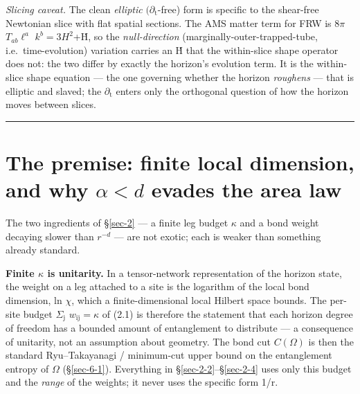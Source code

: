 \documentclass[12pt]{iopart}
\begin{document}
\emph{Slicing caveat.} The clean \emph{elliptic}
\((\partial _{\mathrm{t}}\)-free) form is specific to the shear-free
Newtonian slice with flat spatial sections. The AMS matter term for FRW
is \(8\pi\) \(T_{ab}\ell ^{a}\) \(k^{b} = 3H^{2}\)+Ḣ, so the
\emph{null-direction} (marginally-outer-trapped-tube,
i.e.~time-evolution) variation carries an Ḣ that the within-slice shape
operator does not: the two differ by exactly the horizon's evolution
term. It is the within-slice shape equation --- the one governing
whether the horizon \emph{roughens} --- that is elliptic and slaved; the
\(\partial _{\mathrm{t}}\) enters only the orthogonal question of how
the horizon moves between slices.

\begin{center}\rule{0.5\linewidth}{0.5pt}\end{center}

\section{\texorpdfstring{The premise: finite local dimension, and why
\(\alpha  < d\) evades the area
law}{The premise: finite local dimension, and why \textbackslash alpha  \textless{} d evades the area law}}\label{sec-3}

The two ingredients of §\ref{sec-2} --- a finite leg budget \(\kappa\)
and a bond weight decaying slower than \(r^{-d}\) --- are not exotic;
each is weaker than something already standard.

\textbf{Finite \(\kappa\) is unitarity.} In a tensor-network
representation of the horizon state, the weight on a leg attached to a
site is the logarithm of the local bond dimension, ln \(\chi\), which a
finite-dimensional local Hilbert space bounds. The per-site budget
\(\Sigma _{\mathrm{j}}\) \(w_{\mathrm{ij}} = \kappa\) of (2.1) is
therefore the statement that each horizon degree of freedom has a
bounded amount of entanglement to distribute --- a consequence of
unitarity, not an assumption about geometry. The bond cut \(C(\Omega )\)
is then the standard Ryu--Takayanagi / minimum-cut upper bound on the
entanglement entropy of \(\Omega\) (§\ref{sec-6-1}). Everything in
§\ref{sec-2-2}--§\ref{sec-2-4} uses only this budget and the
\emph{range} of the weights; it never uses the specific form 1/r.
\end{document}
